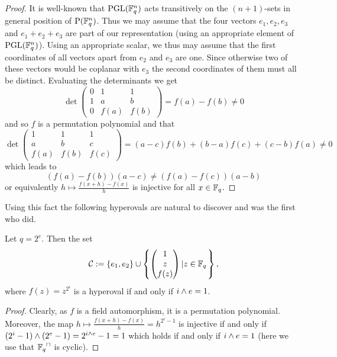 \begin{proof}
    It is well-known that $\mathrm{PGL}(\mathbb{F}_{q}^n)$ acts transitively on the $(n+1)$-sets in general position of $\mathrm{P}(\mathbb{F}_{q}^n)$. Thus we may assume that the four vectors $e_1,e_2,e_3$ and $e_1+e_2+e_3$ are part of our representation (using an appropriate element of $\mathrm{PGL}(\mathbb{F}_{q}^n)$).
    Using an appropriate scalar, we thus may assume that the first coordinates of all vectors apart from $e_2$ and $e_3$ are one. Since otherwise two of these vectors would be coplanar with $e_3$ the second coordinates of them must all be distinct.
    Evaluating the determinants we get
    $$
    \det\begin{pmatrix} 0& 1& 1\\ 1& a& b\\ 0& f(a)& f(b)\end{pmatrix} = f(a)-f(b)\neq 0
    $$
    and so $f$ is a permutation polynomial and that
    $$
    \det\begin{pmatrix} 1& 1& 1\\ a& b& c\\ f(a)& f(b)& f(c)\end{pmatrix} = (a-c)f(b)+(b-a)f(c)+(c-b)f(a)\neq 0 
    $$
    which leads to
    $$
    (f(a)-f(b))(a-c) \neq (f(a)-f(c))(a-b)
    $$
    or equivalently $h\mapsto \frac{f(x+h)-f(x)}{h}$ is injective for all $x\in\mathbb{F}_{q}$.
\end{proof}

Using this fact the following hyperovals are natural to discover and  was the first who did.

\begin{corollary}
    Let $q=2^e$. Then the set
    $$
    \cC:=\set{e_1,e_2}\setjoin\set{\begin{pmatrix} 1\\ z\\ f(z)\end{pmatrix}}[z\in\field{q}],
    $$
    where $f(z)=z^{2^i}$ is a hyperoval if and only if $i\wedge e=1$.
\end{corollary}

\begin{proof}
    Clearly, as $f$ is a field automorphism, it is a permutation polynomial. Moreover, the map $h\mapsto \frac{f(x+h)-f(x)}{h}=h^{2^i-1}$ is injective if and only if $(2^i-1)\wedge(2^e-1)=2^{i\wedge e}-1=1$ which holds if and only if $i\wedge e=1$ (here we use that $\units{\field{q}}$ is cyclic).
\end{proof}

